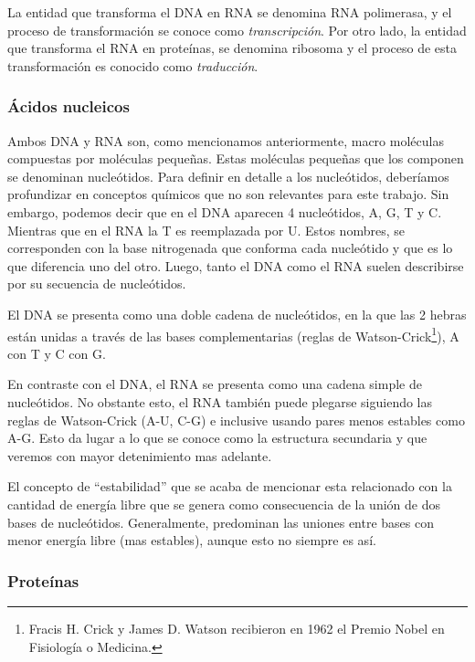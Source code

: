 La entidad que transforma el \ac{DNA} en \ac{RNA} se denomina \ac{RNA}
polimerasa, y el proceso de transformaci\'on se conoce como
\textit{transcripci\'on}. Por otro lado, la entidad que transforma el
\ac{RNA} en prote\'inas, se denomina ribosoma y el proceso de esta
transformaci\'on es conocido como \textit{traducci\'on}.

\subsubsection{\'Acidos nucleicos}

Ambos \ac{DNA} y \ac{RNA} son, como mencionamos anteriormente, macro mol\'eculas
compuestas por mol\'eculas peque\~nas. Estas mol\'eculas peque\~nas que los
componen se denominan nucle\'otidos. Para definir en detalle a los
nucle\'otidos, deber\'iamos profundizar en conceptos qu\'imicos que no son
relevantes para este trabajo. Sin embargo, podemos decir que en el \ac{DNA}
aparecen 4 nucle\'otidos, \ac{A}, \ac{G}, \ac{T} y \ac{C}. Mientras que en el
\ac{RNA} la \ac{T} es reemplazada por \ac{U}. Estos nombres, se corresponden
con la base nitrogenada que conforma cada nucle\'otido y que es lo que
diferencia uno del otro. Luego, tanto el \ac{DNA} como el \ac{RNA} suelen
describirse por su secuencia de nucle\'otidos.

El \ac{DNA} se presenta como una doble cadena de nucle\'otidos, en la que las 2
hebras est\'an unidas a trav\'es de las bases complementarias (reglas de
Watson-Crick\footnote{Fracis H. Crick y James D. Watson recibieron en 1962 el
Premio Nobel en Fisiolog\'ia o Medicina.}), \ac{A} con \ac{T} y \ac{C} con
\ac{G}.

En contraste con el \ac{DNA}, el \ac{RNA} se presenta como una cadena simple de
nucle\'otidos. No obstante esto, el \ac{RNA} tambi\'en puede plegarse siguiendo
las reglas de Watson-Crick (\ac{A}-\ac{U}, \ac{C}-\ac{G}) e inclusive usando
pares menos estables como \ac{A}-\ac{G}. Esto da lugar a lo que se conoce
como la estructura secundaria y que veremos con mayor detenimiento mas adelante.

El concepto de ``estabilidad'' que se acaba de mencionar esta relacionado con
la cantidad de energ\'ia libre que se genera como consecuencia de la uni\'on de
dos bases de nucle\'otidos. Generalmente, predominan las uniones entre bases con
menor energ\'ia libre (mas estables), aunque esto no siempre es as\'i.

\subsubsection{Prote\'inas}

